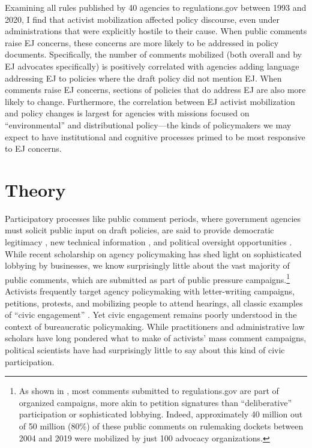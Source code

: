\documentclass[
      12pt,
        ]{article}
\begin{document}
Examining all rules published by 40 agencies to regulations.gov between 1993 and 2020, I find that activist mobilization affected policy discourse, even under administrations that were explicitly hostile to their cause. When public comments raise
EJ concerns, these concerns are more likely to be
addressed in policy documents. Specifically, the number of comments mobilized (both overall and by EJ advocates specifically) is positively correlated with agencies adding language addressing EJ to policies where the draft policy did not mention EJ. When comments raise EJ concerns, sections of policies that do address EJ are also more likely to change.
Furthermore, the correlation between EJ activist mobilization and policy changes is largest for agencies with missions focused on ``environmental'' and distributional policy---the kinds of policymakers we may expect to have institutional and cognitive processes primed to be most responsive to EJ concerns.

\hypertarget{theory}{%
\section{Theory}\label{theory}}

Participatory processes like public comment periods, where government
agencies must solicit public input on draft policies, are said to provide democratic legitimacy \citep{Croley2003, Rosenbloom2003}, new technical information \citep{Yackee2006JPART, Nelson2012}, and political oversight opportunities \citep{Balla1998, Mccubbins1984}. While recent scholarship on agency policymaking has shed light on sophisticated lobbying by businesses, we know surprisingly little about the vast majority of public comments, which are submitted as part of public pressure campaigns.\footnote{
  As shown in \citet{judgelord2019SPSA}, most comments submitted to
  regulations.gov are part of organized campaigns, more akin to petition signatures than ``deliberative'' participation or sophisticated lobbying. Indeed, approximately 40 million out of
  50 million (80\%) of these public comments on rulemaking dockets between 2004 and 2019 were mobilized by just 100
  advocacy organizations.}
Activists frequently target agency policymaking with letter-writing campaigns, petitions, protests,
and mobilizing people to attend hearings, all classic examples of ``civic engagement'' \citep{Verba1987}. Yet civic engagement remains poorly understood in the context of bureaucratic policymaking.
While practitioners and administrative law scholars have long pondered
what to make of activists' mass comment campaigns, political scientists have had
surprisingly little to say about this kind of civic participation.
\end{document}
